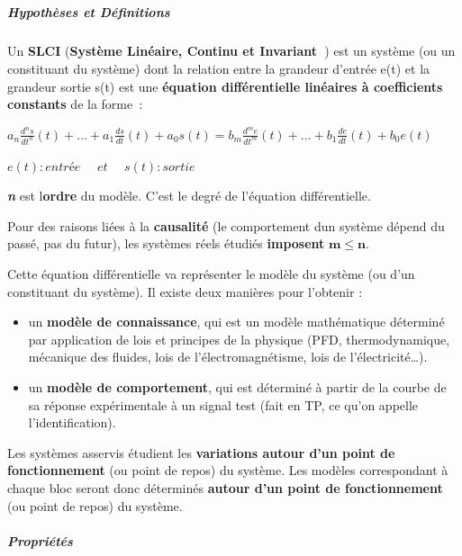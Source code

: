 \hypertarget{mod-section}{%
\subparagraph*{}\label{mod-section}}

\hypertarget{mod-hypothuxe8ses-et-duxe9finitions}{%
\subparagraph*{Hypothèses et Définitions}\label{mod-hypothuxe8ses-et-duxe9finitions}}

Un \textbf{SLCI} (\textbf{Système Linéaire, Continu et Invariant~}) est un système (ou un constituant du système) dont la relation entre la grandeur d'entrée e(t) et la grandeur sortie s(t) est une \textbf{équation différentielle linéaires à coefficients constants} de la forme~:

\(a_{n}\frac{d^{n}s}{{dt}^{n}}(t) + \ldots + a_{1}\frac{ds}{dt}(t) + a_{0}s(t) = b_{m}\frac{d^{m}e}{{dt}^{m}}(t) + \ldots + b_{1}\frac{de}{dt}(t) + b_{0}e(t)\)

\(e(t):entrée\ \ \ \ \ \ et\ \ \ \ \ \ s(t):sortie\)

\textbf{\emph{n}} est l\textquotesingle{}\textbf{ordre} du modèle. C'est le degré de l'équation différentielle.

Pour des raisons liées à la \textbf{causalité} (le comportement d\textquotesingle un système dépend du passé, pas du futur), les systèmes réels étudiés \textbf{imposent} \(\mathbf{m \leq n}\).

Cette équation différentielle va représenter le modèle du système (ou d'un constituant du système). Il existe deux manières pour l'obtenir :

\begin{itemize}
\item
  un \textbf{modèle de connaissance}, qui est un modèle mathématique déterminé par application de lois et principes de la physique (PFD, thermodynamique, mécanique des fluides, lois de l'électromagnétisme, lois de l'électricité\ldots).
\item
  un \textbf{modèle de comportement}, qui est déterminé à partir de la courbe de sa réponse expérimentale à un signal test (fait en TP, ce qu'on appelle l'identification).
\end{itemize}

Les systèmes asservis étudient les \textbf{variations autour d'un point de fonctionnement} (ou point de repos) du système. Les modèles correspondant à chaque bloc seront donc déterminés \textbf{autour d'un point de fonctionnement} (ou point de repos) du système.

\hypertarget{mod-propriuxe9tuxe9s}{%
\subparagraph*{Propriétés}\label{mod-propriuxe9tuxe9s}}

